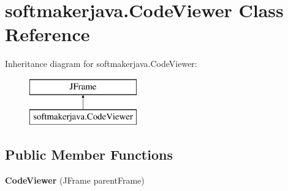 \hypertarget{classsoftmakerjava_1_1_code_viewer}{}\section{softmakerjava.\+Code\+Viewer Class Reference}
\label{classsoftmakerjava_1_1_code_viewer}
Inheritance diagram for softmakerjava.\+Code\+Viewer\+:\begin{figure}[H]
\begin{center}
\leavevmode
\includegraphics[height=2.000000cm]{classsoftmakerjava_1_1_code_viewer}
\end{center}
\end{figure}
\subsection*{Public Member Functions}
\begin{DoxyCompactItemize}
\item 
{\bfseries Code\+Viewer} (J\+Frame parent\+Frame)\hypertarget{classsoftmakerjava_1_1_code_viewer_a76900eb47a75cdba14fea5e5669dcb7d}{}\label{classsoftmakerjava_1_1_code_viewer_a76900eb47a75cdba14fea5e5669dcb7d}

\end{DoxyCompactItemize}
